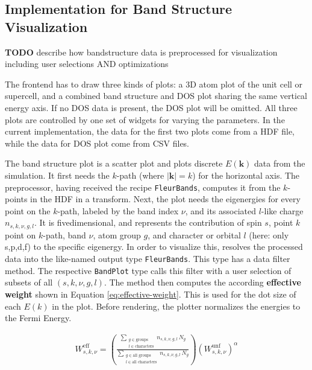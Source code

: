 \subsection{Implementation for Band Structure Visualization}
\label{sec:preprocessor-implementation}

\textbf{TODO} describe how bandstructure data is preprocessed for visualization
including user selections AND optimizations

The frontend has to draw three kinds of plots: a 3D atom plot of the unit cell
or supercell, and a combined band structure and DOS plot sharing the same
vertical energy axis. If no DOS data is present, the DOS plot will be omitted.
All three plots are controlled by one set of widgets for varying the parameters.
In the current implementation, the data for the first two plots come from a HDF
file, while the data for DOS plot come from CSV files.

The band structure plot is a scatter plot and plots discrete \(E(\mathbf{k})\) data
from the simulation. It first needs the \(k\)-path (where \(|\mathbf{k}|=k\)) for
the horizontal axis. The preprocessor, having received the recipe
\texttt{FleurBands}, computes it from the \(k\)-points in the HDF in a
transform. Next, the plot needs the eigenergies for every point on the
\(k\)-path, labeled by the band index \(\nu\), and its associated \(l\)-like
charge \(n_{s,k,\nu,g,l}\). It is fivedimensional, and represents the
contribution of spin \(s\), point \(k\) point on \(k\)-path, band \(\nu\), atom
group \(g\), and character or orbital \(l\) (here: only s,p,d,f) to the specific
eigenergy. In order to visualize this, resolves the processed data into the
like-named output type \texttt{FleurBands}. This type has a data filter method.
The respective \texttt{BandPlot} type calls this filter with a user selection of
subsets of all \((s,k,\nu,g,l)\). The method then computes the according
\textbf{effective weight} shown in Equation \ref{eq:effective-weight}. This is
used for the dot size of each \(E(k)\) in the plot. Before rendering, the
plotter normalizes the energies to the Fermi Energy.

\begin{align}
  W^{\text{eff}}_{s,k,\nu} = \left( \frac{\sum\limits_{\substack{g \in \text{groups} \\ l \in \text{characters}}} n_{s,k,\nu,g,l}\, N_g}{\sum\limits_{\substack{g \in \text{all groups} \\ l \in \text{all characters}}} n_{s,k,\nu,g,l}\, N_g} \right) \left(W_{s,k,\nu}^{\text{unf}}\right)^\alpha
\label{eq:effective-weight}
\end{align}

